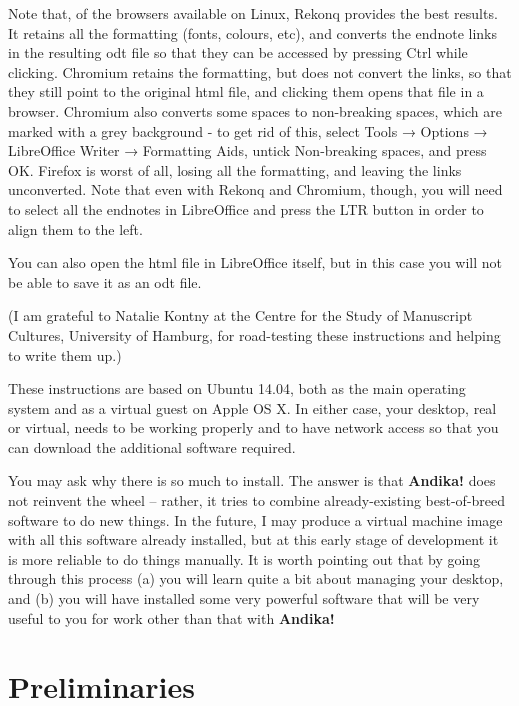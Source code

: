 \documentclass[a4paper,10pt]{article}
\begin{document}
Note that, of the browsers available on Linux, Rekonq provides the best results. It retains all the formatting (fonts, colours, etc), and converts the endnote links in the resulting odt file so that they can be accessed by pressing Ctrl while clicking. Chromium retains the formatting, but does not convert the links, so that they still point to the original html file, and clicking them opens that file in a browser. Chromium also converts some spaces to non-breaking spaces, which are marked with a grey background - to get rid of this, select Tools → Options → LibreOffice Writer → Formatting Aids, untick Non-breaking spaces, and press OK. Firefox is worst of all, losing all the formatting, and leaving the links unconverted. Note that even with Rekonq and Chromium, though, you will need to select all the endnotes in LibreOffice and press the LTR button in order to align them to the left.

You can also open the html file in LibreOffice itself, but in this case you will not be able to save it as an odt file. 




\newpage

\appendix
\renewcommand{\appendixpagename}{Appendix 1: Installing \textit{Andika!}}

\appendixpage

(I am grateful to Natalie Kontny at the Centre for the Study of Manuscript Cultures, University of Hamburg, for road-testing these instructions and helping to write them up.)

These instructions are based on Ubuntu 14.04, both as the main operating system and as a virtual guest on Apple OS X. In either case, your desktop, real or virtual, needs to be working properly and to have network access so that you can download the additional software required.

You may ask why there is so much to install.  The answer is that \textbf{Andika!} does not reinvent the wheel -- rather, it tries to combine already-existing best-of-breed software to do new things.  In the future, I may produce a virtual machine image with all this software already installed, but at this early stage of development it is more reliable to do things manually.  It is worth pointing out that by going through this process (a) you will learn quite a bit about managing your desktop, and (b) you will have installed some very powerful software that will be very useful to you for work other than that with \textbf{Andika!}

\section{Preliminaries}
\end{document}
